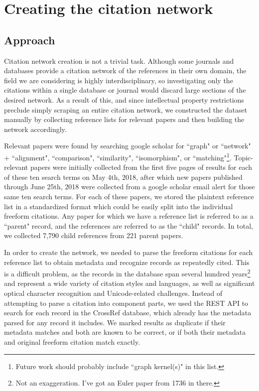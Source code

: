 \documentclass[12pt]{thesis}
\theoremstyle{plain}
\theoremstyle{definition}
\theoremstyle{remark}
\begin{document}
\chapter{Creating the citation network}\label{chapter:dataset_creation_and_analysis}

\section{Approach}

Citation network creation is not a trivial task. Although some journals and databases provide a citation network of the references in their own domain, the field we are considering is highly interdisciplinary, so investigating only the citations within a single database or journal would discard large sections of the desired network. As a result of this, and since intellectual property restrictions preclude simply scraping an entire citation network, we constructed the dataset manually by collecting reference lists for relevant papers and then building the network accordingly.

Relevant papers were found by searching google scholar for ``graph" or ``network" +  ``alignment", ``comparison", ``similarity", ``isomorphism", or ``matching"\footnote{Future work should probably include ``graph kernel(s)" in this list.}. Topic-relevant papers were initially collected from the first five pages of results for each of these ten search terms on May 4th, 2018, after which new papers published through June 25th, 2018 were collected from a google scholar email alert for those same ten search terms. For each of these papers, we stored the plaintext reference list in a standardized format which could be easily split into the individual freeform citations. Any paper for which we have a reference list is referred to as a ``parent" record, and the references are referred to as the ``child" records. In total, we collected 7,790 child references from 221 parent papers.

In order to create the network, we needed to parse the freeform citations for each reference list to obtain metadata and recognize records as repeatedly cited. This is a difficult problem, as the records in the database span several hundred years\footnote{Not an exaggeration. I've got an Euler paper from 1736 in there.} and represent a wide variety of citation styles and languages, as well as significant optical character recognition and Unicode-related challenges. Instead of attempting to parse a citation into component parts, we used the REST API to search for each record in the CrossRef database, which already has the metadata parsed for any record it includes. We marked results as duplicate if their metadata matches and both are known to be correct, or if both their metadata and original freeform citation match exactly. 
\end{document}

